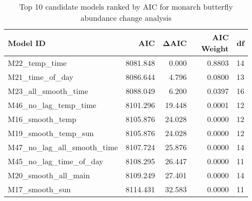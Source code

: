 \begin{table}

\caption{Top 10 candidate models ranked by AIC for monarch butterfly abundance change analysis}
\centering
\begin{tabular}[t]{lrrrr}
\toprule
Model ID & AIC & ΔAIC & AIC Weight & df\\
\midrule
M22\_temp\_time & 8081.848 & 0.000 & 0.8803 & 14\\
M21\_time\_of\_day & 8086.644 & 4.796 & 0.0800 & 13\\
M23\_all\_smooth\_time & 8088.049 & 6.200 & 0.0397 & 16\\
M46\_no\_lag\_temp\_time & 8101.296 & 19.448 & 0.0001 & 12\\
M16\_smooth\_temp & 8105.876 & 24.028 & 0.0000 & 12\\
\addlinespace
M19\_smooth\_temp\_sun & 8105.876 & 24.028 & 0.0000 & 12\\
M47\_no\_lag\_all\_smooth\_time & 8107.724 & 25.876 & 0.0000 & 14\\
M45\_no\_lag\_time\_of\_day & 8108.295 & 26.447 & 0.0000 & 11\\
M20\_smooth\_all\_main & 8109.249 & 27.401 & 0.0000 & 14\\
M17\_smooth\_sun & 8114.431 & 32.583 & 0.0000 & 11\\
\bottomrule
\end{tabular}
\end{table}

